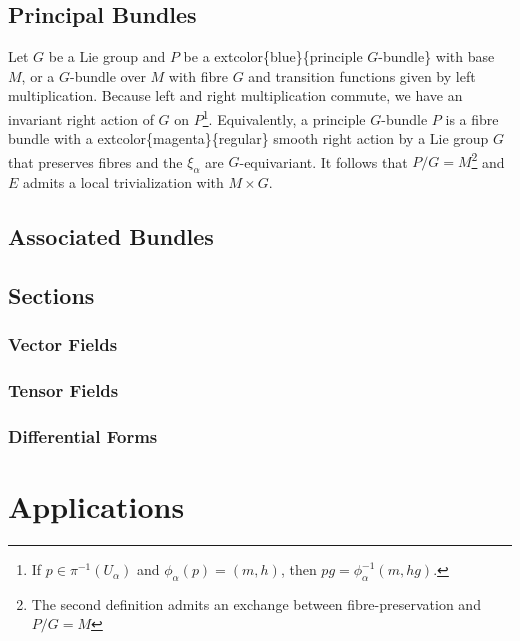 \documentclass[
]{book}
\begin{document}
\hypertarget{principal-bundles}{%
\section{Principal Bundles}\label{principal-bundles}}

Let \(G\) be a Lie group and \(P\) be a extcolor\{blue\}\{principle \(G\)-bundle\} with base \(M\), or a \(G\)-bundle over \(M\) with fibre \(G\) and transition functions given by left multiplication. Because left and right multiplication commute, we have an invariant right action of \(G\) on \(P\)\footnote{If \(p \in \pi^{-1}(U_\alpha)\) and \(\phi_\alpha(p) = (m,h)\), then \(pg = \phi_\alpha^{-1}(m,hg)\).}. Equivalently, a principle \(G\)-bundle \(P\) is a fibre bundle with a extcolor\{magenta\}\{regular\} smooth right action by a Lie group \(G\) that preserves fibres and the \(\xi_\alpha\) are \(G\)-equivariant. It follows that \(P/G = M\)\footnote{The second definition admits an exchange between fibre-preservation and \(P/G = M\)} and \(E\) admits a local trivialization with \(M \times G\).

\hypertarget{associated-bundles}{%
\section{Associated Bundles}\label{associated-bundles}}

\hypertarget{sections}{%
\section{Sections}\label{sections}}

\hypertarget{vector-fields}{%
\subsection{Vector Fields}\label{vector-fields}}

\hypertarget{tensor-fields}{%
\subsection{Tensor Fields}\label{tensor-fields}}

\hypertarget{differential-forms}{%
\subsection{Differential Forms}\label{differential-forms}}

\hypertarget{applications}{%
\chapter{Applications}\label{applications}}
\end{document}

